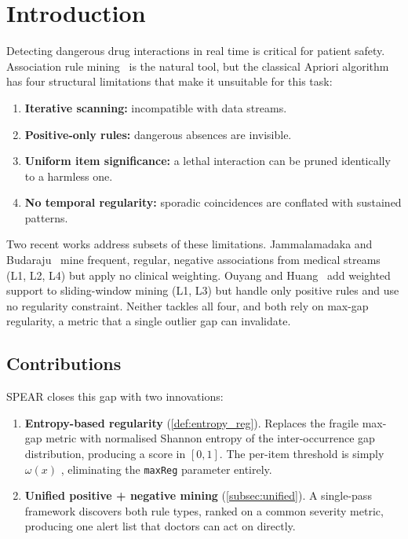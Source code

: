 \documentclass[10pt,twocolumn]{article}
\theoremstyle{plain}
\theoremstyle{definition}
\theoremstyle{remark}
\begin{document}
\section{Introduction}
\label{sec:intro}

Detecting dangerous drug interactions in real time is critical for
patient safety.
Association rule mining~\cite{agrawal1994} is the natural tool, but
the classical Apriori algorithm has four structural limitations that
make it unsuitable for this task:

\begin{enumerate}[label=\textbf{L\arabic*.}, leftmargin=*, itemsep=2pt]
  \item \textbf{Iterative scanning:} incompatible with data streams.
  \item \textbf{Positive-only rules:} dangerous absences are invisible.
  \item \textbf{Uniform item significance:} a lethal interaction can
        be pruned identically to a harmless one.
  \item \textbf{No temporal regularity:} sporadic coincidences are
        conflated with sustained patterns.
\end{enumerate}

Two recent works address subsets of these limitations.
Jammalamadaka and Budaraju~\cite{sastry2025} mine frequent, regular,
negative associations from medical streams (L1, L2, L4) but apply no
clinical weighting.
Ouyang and Huang~\cite{ouyang2015} add weighted support to sliding-window
mining (L1, L3) but handle only positive rules and use no regularity
constraint.
Neither tackles all four, and both rely on max-gap regularity, a
metric that a single outlier gap can invalidate.

\subsection{Contributions}
\label{subsec:contributions}

SPEAR closes this gap with two innovations:

\begin{enumerate}[leftmargin=*]
  \item \textbf{Entropy-based regularity} (\cref{def:entropy_reg}).
        Replaces the fragile max-gap metric with normalised Shannon
        entropy of the inter-occurrence gap distribution, producing a
        score in $[0,1]$.
        The per-item threshold is simply $\omega(x)$ , eliminating
        the \texttt{maxReg} parameter entirely.

  \item \textbf{Unified positive + negative mining}
        (\cref{subsec:unified}).
        A single-pass framework discovers both rule types, ranked on a
        common severity metric, producing one alert list that doctors
        can act on directly.
\end{enumerate}
\end{document}
